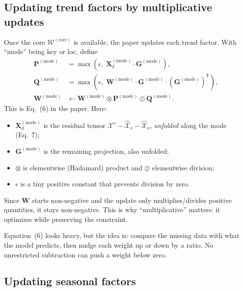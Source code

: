 \subsection{Updating trend factors by multiplicative updates}

Once the core $\mathcal{W}^{(\mathrm{core})}$ is available, the paper updates each trend factor. With
``mode'' being key or loc, define
\begin{align}
  \mathbf{P}^{(\mathrm{mode})}
  &=\max\!\left(\epsilon,\;
    \mathbf{X}_d^{(\mathrm{mode})}\cdot\mathbf{G}^{(\mathrm{mode})}
   \right), \label{eq:w-p}\\
  \mathbf{Q}^{(\mathrm{mode})}
  &=\max\!\left(\epsilon,\;
    \mathbf{W}^{(\mathrm{mode})}\cdot\mathbf{G}^{(\mathrm{mode})}
    \cdot(\mathbf{G}^{(\mathrm{mode})})^{\mathsf T}
   \right), \label{eq:w-q}\\
  \mathbf{W}^{(\mathrm{mode})}
  &\leftarrow
    \mathbf{W}^{(\mathrm{mode})}
    \otimes\mathbf{P}^{(\mathrm{mode})}
    \oslash\mathbf{Q}^{(\mathrm{mode})}.
  \label{eq:multiplicative}
\end{align}
This is Eq.~(6) in the paper. Here:
\begin{itemize}
  \item $\mathbf{X}_d^{(\mathrm{mode})}$ is the residual tensor
        $\mathcal{X}^{c}-\widehat{\mathcal{X}}_s-\widehat{\mathcal{X}}_o$, \emph{unfolded} along
        the mode (Eq.~7);
  \item $\mathbf{G}^{(\mathrm{mode})}$ is the remaining projection, also unfolded;
  \item $\otimes$ is elementwise (Hadamard) product and $\oslash$ elementwise division;
  \item $\epsilon$ is a tiny positive constant that prevents division by zero.
\end{itemize}
Since $\mathbf{W}$ starts non-negative and the update only multiplies/divides positive quantities, it
stays non-negative. This is why ``multiplicative'' matters: it optimizes while preserving the
constraint.

\begin{plainwords}
Equation~(6) looks heavy, but the idea is: compare the missing data with what the model predicts, then
nudge each weight up or down by a ratio. No unrestricted subtraction can push a weight below zero.
\end{plainwords}

\subsection{Updating seasonal factors}

